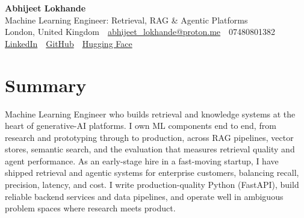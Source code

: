 \documentclass[10pt,a4paper]{article}
\newcommand{\sep}{\,\textcolor{accent!60}{\textbar}\,}
\begin{document}
\begin{center}
  {\fontsize{24}{26}\selectfont\bfseries Abhijeet Lokhande}\\[3pt]
  {\color{accent}\large Machine Learning Engineer: Retrieval, RAG \& Agentic Platforms}\\[5pt]
  {\small
    London, United Kingdom \sep
    \href{mailto:abhijeet_lokhande@proton.me}{abhijeet\_lokhande@proton.me} \sep
    07480801382 \\[2pt]
    \href{https://www.linkedin.com/in/ablds/}{LinkedIn} \sep
    \href{https://github.com/abhijeetscode}{GitHub} \sep
    \href{https://huggingface.co/ab-ai}{Hugging Face}
  }
\end{center}
\vspace{2pt}

\section{Summary}
Machine Learning Engineer who builds retrieval and knowledge systems at the heart of generative-AI platforms. I own ML components end to end, from research and prototyping through to production, across RAG pipelines, vector stores, semantic search, and the evaluation that measures retrieval quality and agent performance. As an early-stage hire in a fast-moving startup, I have shipped retrieval and agentic systems for enterprise customers, balancing recall, precision, latency, and cost. I write production-quality Python (FastAPI), build reliable backend services and data pipelines, and operate well in ambiguous problem spaces where research meets product.

\end{document}
